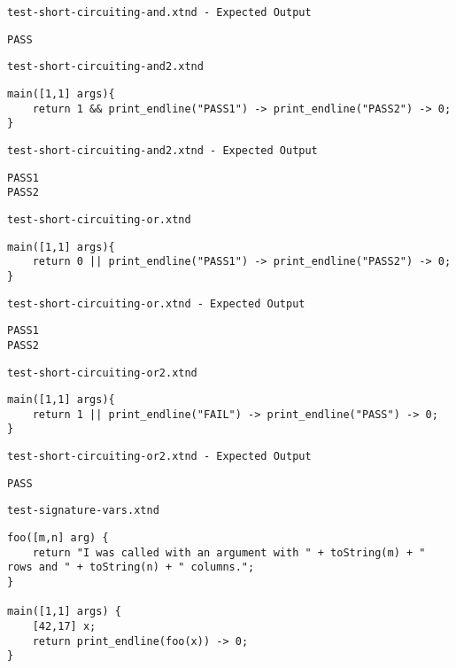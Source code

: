 \medskip \noindent \texttt{test-short-circuiting-and.xtnd - Expected Output}


\begin{lstlisting}
PASS
\end{lstlisting}


\medskip \noindent \texttt{test-short-circuiting-and2.xtnd}


\begin{lstlisting}
main([1,1] args){
	return 1 && print_endline("PASS1") -> print_endline("PASS2") -> 0;
}
\end{lstlisting}


\medskip \noindent \texttt{test-short-circuiting-and2.xtnd - Expected Output}


\begin{lstlisting}
PASS1
PASS2
\end{lstlisting}


\medskip \noindent \texttt{test-short-circuiting-or.xtnd}


\begin{lstlisting}
main([1,1] args){
	return 0 || print_endline("PASS1") -> print_endline("PASS2") -> 0;
}
\end{lstlisting}


\medskip \noindent \texttt{test-short-circuiting-or.xtnd - Expected Output}


\begin{lstlisting}
PASS1
PASS2
\end{lstlisting}


\medskip \noindent \texttt{test-short-circuiting-or2.xtnd}


\begin{lstlisting}
main([1,1] args){
	return 1 || print_endline("FAIL") -> print_endline("PASS") -> 0;
}
\end{lstlisting}


\medskip \noindent \texttt{test-short-circuiting-or2.xtnd - Expected Output}


\begin{lstlisting}
PASS
\end{lstlisting}


\medskip \noindent \texttt{test-signature-vars.xtnd}


\begin{lstlisting}
foo([m,n] arg) {
	return "I was called with an argument with " + toString(m) + " rows and " + toString(n) + " columns.";
}

main([1,1] args) {
	[42,17] x;
	return print_endline(foo(x)) -> 0;
}
\end{lstlisting}


